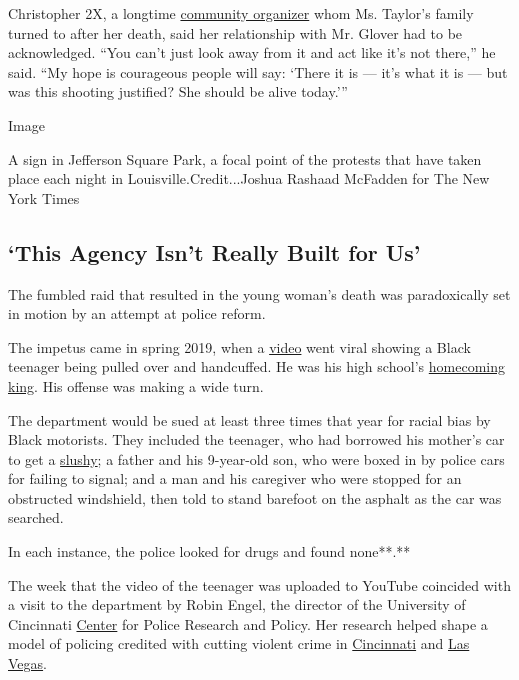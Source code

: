 Christopher 2X, a longtime \href{https://2xgamechangers.org}{community
organizer} whom Ms. Taylor's family turned to after her death, said her
relationship with Mr. Glover had to be acknowledged. ``You can't just
look away from it and act like it's not there,'' he said. ``My hope is
courageous people will say: `There it is --- it's what it is --- but was
this shooting justified? She should be alive today.'''

Image

A sign in Jefferson Square Park, a focal point of the protests that have
taken place each night in Louisville.Credit...Joshua Rashaad McFadden
for The New York Times

\hypertarget{this-agency-isnt-really-built-for-us}{%
\subsection{`This Agency Isn't Really Built for
Us'}\label{this-agency-isnt-really-built-for-us}}

The fumbled raid that resulted in the young woman's death was
paradoxically set in motion by an attempt at police reform.

The impetus came in spring 2019, when a
\href{https://www.courier-journal.com/story/news/investigations/2019/04/04/louisville-kentucky-police-stopped-frisked-handcuffed-black-teen-for-wide-turn/3210229002/}{video}
went viral showing a Black teenager being pulled over and handcuffed. He
was his high school's
\href{https://www.courier-journal.com/story/news/investigations/2019/04/04/louisville-kentucky-police-stopped-frisked-handcuffed-black-teen-for-wide-turn/3210229002/}{homecoming
king}. His offense was making a wide turn.

The department would be sued at least three times that year for racial
bias by Black motorists. They included the teenager, who had borrowed
his mother's car to get a
\href{https://www.courier-journal.com/story/news/investigations/2019/04/04/louisville-kentucky-police-stopped-frisked-handcuffed-black-teen-for-wide-turn/3210229002/}{slushy};
a father and his 9-year-old son, who were boxed in by police cars for
failing to signal; and a man and his caregiver who were stopped for an
obstructed windshield, then told to stand barefoot on the asphalt as the
car was searched.

In each instance, the police looked for drugs and found none**.**

The week that the video of the teenager was uploaded to YouTube
coincided with a visit to the department by Robin Engel, the director of
the University of Cincinnati
\href{https://www.theiacp.org/research}{Center} for Police Research and
Policy. Her research helped shape a model of policing credited with
cutting violent crime in
\href{https://www.theiacp.org/sites/default/files/Research\%20Center/CPD\%20PIVOT\%20Goldstein\%20Submission.pdf}{Cincinnati}
and
\href{https://www.theiacp.org/sites/default/files/Research\%20Center/Crime\%20Place\%20Networks\%20in\%20Las\%20Vegas\%20-\%20Police\%20Chief\%20Magazine.pdf}{Las
Vegas}.

